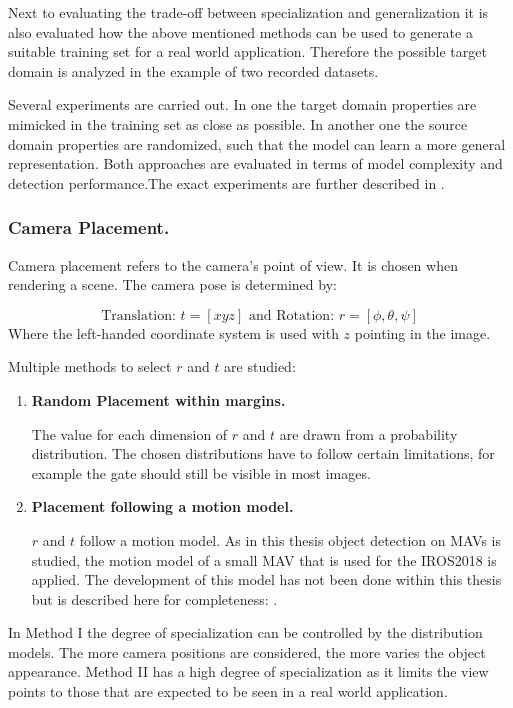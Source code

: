 Next to evaluating the trade-off between specialization and generalization it is also evaluated how the above mentioned methods can be used to generate a suitable training set for a real world application. Therefore the possible target domain is analyzed in the example of two recorded datasets. 

Several experiments are carried out. In one the target domain properties are mimicked in the training set as close as possible. In another one the source domain properties are randomized, such that the model can learn a more general representation. Both approaches are evaluated in terms of model complexity and detection performance.The exact experiments are further described in .

\subsubsection{Camera Placement.}

Camera placement refers to the camera's point of view. It is chosen when rendering a scene. The camera pose is determined by:

$$
\text{Translation: }t = [x y z] \text{ and Rotation: } r = [\phi, \theta, \psi]
$$
Where the left-handed coordinate system is used with $z$ pointing in the image.

Multiple methods to select $r$ and $t$ are studied:

\begin{enumerate}
	\item \textbf{Random Placement within margins.}

		  The value for each dimension of $r$ and $t$ are drawn from a probability distribution. The chosen distributions have to follow certain limitations, for example the gate should still be visible in most images.

	\item \textbf{Placement following a motion model.}

		$r$ and $t$ follow a motion model. As in this thesis object detection on \acp{MAV} is studied, the motion model of a small \ac{MAV} that is used for the IROS2018 is applied. The development of this model has not been done within this thesis but is described here for completeness: .

\end{enumerate}

In Method I the degree of specialization can be controlled by the distribution models. The more camera positions are considered, the more varies the object appearance. Method II has a high degree of specialization as it limits the view points to those that are expected to be seen in a real world application.

